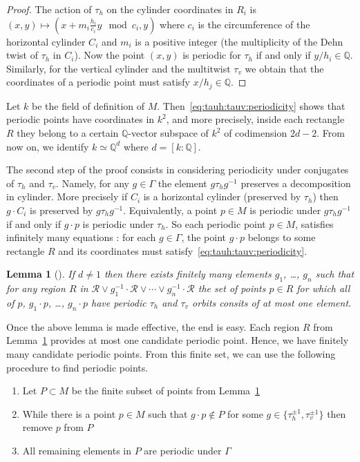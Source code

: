 \documentclass[a4paper,12pt]{article}
\def\bQ{\mathbb{Q}}
\newtheorem{lemma}[definition]{Lemma}
\begin{document}
\begin{proof}
The action of $\tau_h$ on the cylinder coordinates in $R_i$ is $(x,y) \mapsto
(x + m_i \frac{h_i}{c_i} y \mod c_i, y)$ where $c_i$ is the circumference of
the horizontal cylinder $C_i$ and $m_i$ is a positive integer (the multiplicity
of the Dehn twist of $\tau_h$ in $C_i$). Now the point $(x, y)$ is periodic for
$\tau_h$ if and only if $y/h_i \in \bQ$. Similarly, for the vertical cylinder
and the multitwist $\tau_v$ we obtain that the coordinates of a periodic point
must satisfy $x / h_j \in \bQ$.
\end{proof}

Let $k$ be the field of definition of $M$. Then~\eqref{eq:tauh:tauv:periodicity}
shows that periodic points have coordinates in $k^2$, and more precisely, inside
each rectangle $R$ they belong to a certain $\bQ$-vector subspace of $k^2$ of
codimension $2d-2$. From now on, we identify $k \simeq \bQ^d$ where $d = [k:\bQ]$.

\smallskip

The second step of the proof consists in considering periodicity under conjugates
of $\tau_h$ and $\tau_v$. Namely, for any $g \in \Gamma$
the element $g \tau_h g^{-1}$ preserves a decomposition in cylinder. More precisely
if $C_i$ is a horizontal cylinder (preserved by $\tau_h$) then $g \cdot C_i$ is preserved
by $g \tau_h g^{-1}$. Equivalently, a point $p \in M$ is periodic under $g \tau_h g^{-1}$
if and only if $g \cdot p$ is periodic under $\tau_h$. So each periodic point $p \in M$,
satisfies infinitely many equations : for each $g \in \Gamma$, the point $g \cdot p$ belongs
to some rectangle $R$ and its coordinates must satisfy~\eqref{eq:tauh:tauv:periodicity}.

\begin{lemma}[\cite{ChowdhuryEverettFreedmanLee}]
\label{lem:finitely:many:g}
If $d\not=1$ then there
exists finitely many elements $g_1$, \ldots, $g_n$ such that
for any region $R$ in $\mathcal{R} \vee g_1^{-1} \cdot \mathcal{R} \vee \cdots \vee g_n^{-1} \cdot \mathcal{R}$
the set of points $p \in R$ for which all of $p$, $g_1 \cdot p$,
\ldots, $g_n \cdot p$ have periodic $\tau_h$ and $\tau_v$ orbits
consits of at most one element.
\end{lemma}

Once the above lemma is made effective, the end is easy. Each region $R$
from Lemma~\ref{lem:finitely:many:g} provides at most one candidate periodic
point. Hence, we have finitely many candidate periodic points. From this
finite set, we can use the following procedure to find periodic points.
\begin{enumerate}
\item Let $P \subset M$ be the finite subset of points from Lemma~\ref{lem:finitely:many:g}
\item While there is a point $p \in M$ such that $g \cdot p \not\in P$ for some
$g \in \{\tau_h^{\pm 1}, \tau_v^{\pm 1}\}$ then remove $p$ from $P$
\item All remaining elements in $P$ are periodic under $\Gamma$
\end{enumerate}
\end{document}
